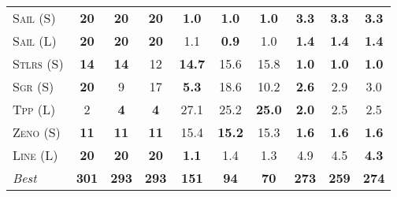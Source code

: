 \documentclass[11pt]{article}
\begin{document}
\begin{table*}[tb]
{\begin{tabular}{|l||ccc||ccc||ccc||}
\textsc{Sail} (S)&\textbf{20}&\textbf{20}&\textbf{20}&\textbf{1.0}&\textbf{1.0}&\textbf{1.0}&\textbf{3.3}&\textbf{3.3}&\textbf{3.3}\\
\textsc{Sail} (L)&\textbf{20}&\textbf{20}&\textbf{20}&1.1&\textbf{0.9}&1.0&\textbf{1.4}&\textbf{1.4}&\textbf{1.4}\\
\textsc{Stlrs} (S)&\textbf{14}&\textbf{14}&12&\textbf{14.7}&15.6&15.8&\textbf{1.0}&\textbf{1.0}&\textbf{1.0}\\
\textsc{Sgr} (S)&\textbf{20}&9&17&\textbf{5.3}&18.6&10.2&\textbf{2.6}&2.9&3.0\\
\textsc{Tpp} (L)&2&\textbf{4}&\textbf{4}&27.1&25.2&\textbf{25.0}&\textbf{2.0}&2.5&2.5\\
\textsc{Zeno} (S)&\textbf{11}&\textbf{11}&\textbf{11}&15.4&\textbf{15.2}&15.3&\textbf{1.6}&\textbf{1.6}&\textbf{1.6}\\
\textsc{Line} (L)&\textbf{20}&\textbf{20}&\textbf{20}&\textbf{1.1}&1.4&1.3&4.9&4.5&\textbf{4.3}
\\\hline
\textit{Best}&\textbf{301}&\textbf{293}&\textbf{293}&\textbf{151}&\textbf{94}&\textbf{70}&\textbf{273}&\textbf{259}&\textbf{274}\\\hline

        \end{tabular}}
        \caption{}
        \label{tab:all-patty}
        \end{table*}
        
\end{document}
